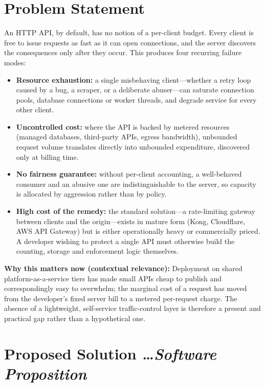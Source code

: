 \documentclass[11pt,a4paper]{article}
\newcommand{\BvrHint}[1]{%
  {\normalfont\normalsize\itshape\hfill #1}}
\begin{document}
\section{Problem Statement}
An HTTP API, by default, has no notion of a per-client budget. Every client is
free to issue requests as fast as it can open connections, and the server
discovers the consequences only after they occur. This produces four
recurring failure modes:
\begin{itemize}[leftmargin=0.7cm]
    \item \textbf{Resource exhaustion:} a single misbehaving client---whether
      a retry loop caused by a bug, a scraper, or a deliberate abuser---can
      saturate connection pools, database connections or worker threads, and
      degrade service for every other client.
    \item \textbf{Uncontrolled cost:} where the API is backed by metered
      resources (managed databases, third-party APIs, egress bandwidth),
      unbounded request volume translates directly into unbounded expenditure,
      discovered only at billing time.
    \item \textbf{No fairness guarantee:} without per-client accounting, a
      well-behaved consumer and an abusive one are indistinguishable to the
      server, so capacity is allocated by aggression rather than by policy.
    \item \textbf{High cost of the remedy:} the standard solution---a
      rate-limiting gateway between clients and the origin---exists in mature
      form (Kong, Cloudflare, AWS API Gateway) but is either operationally
      heavy or commercially priced. A developer wishing to protect a single
      API must otherwise build the counting, storage and enforcement logic
      themselves.
\end{itemize}

\textbf{Why this matters now (contextual relevance):} Deployment on shared
platform-as-a-service tiers has made small APIs cheap to publish and
correspondingly easy to overwhelm; the marginal cost of a request has moved
from the developer's fixed server bill to a metered per-request charge. The
absence of a lightweight, self-service traffic-control layer is therefore a
present and practical gap rather than a hypothetical one.

\section{Proposed Solution %
\BvrHint{\ldots Software Proposition}}
\end{document}
